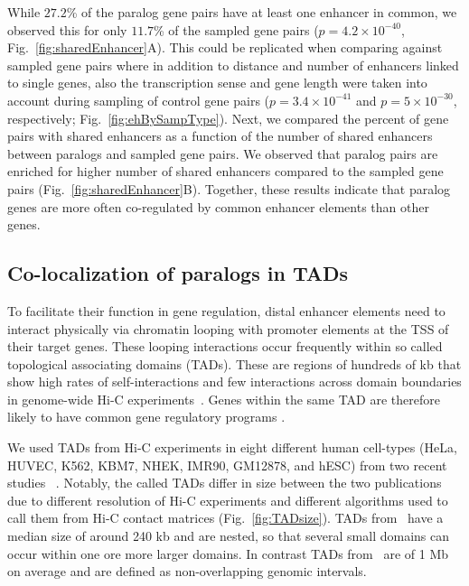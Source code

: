\documentclass[a4paper,twoside=true,openright,parskip=full,chapterprefix=true,11pt,headings=normal,bibliography=totoc,listof=totoc,titlepage=on,captions=tableabove,draft=false]{scrreprt}
\theoremstyle{definition}
\theoremstyle{definition}
\theoremstyle{definition}
\theoremstyle{remark}
\begin{document}
While \(27.2\)\% of the paralog gene pairs have at least one enhancer in
common, we observed this for only \(11.7\)\% of the sampled gene pairs
(\(p=4.2\times10^{-40}\), Fig.~\ref{fig:sharedEnhancer}A). This could be
replicated when comparing against sampled gene pairs where in addition
to distance and number of enhancers linked to single genes, also the
transcription sense and gene length were taken into account during
sampling of control gene pairs (\(p=3.4\times10^{-41}\) and
\(p=5\times10^{-30}\), respectively; Fig.~\ref{fig:ehBySampType}). Next,
we compared the percent of gene pairs with shared enhancers as a
function of the number of shared enhancers between paralogs and sampled
gene pairs. We observed that paralog pairs are enriched for higher
number of shared enhancers compared to the sampled gene pairs
(Fig.~\ref{fig:sharedEnhancer}B). Together, these results indicate that
paralog genes are more often co-regulated by common enhancer elements
than other genes.

\hypertarget{co-localization-of-paralogs-in-tads}{%
\subsection{Co-localization of paralogs in
TADs}\label{co-localization-of-paralogs-in-tads}}

To facilitate their function in gene regulation, distal enhancer
elements need to interact physically via chromatin looping with promoter
elements at the TSS of their target genes. These looping interactions
occur frequently within so called topological associating domains
(TADs). These are regions of hundreds of kb that show high rates of
self-interactions and few interactions across domain boundaries in
genome-wide Hi-C experiments~\citep{Dixon2012, Rao2014}. Genes within
the same TAD are therefore likely to have common gene regulatory
programs \citep{LeDily2014, Nora2012}.

We used TADs from Hi-C experiments in eight different human cell-types
(HeLa, HUVEC, K562, KBM7, NHEK, IMR90, GM12878, and hESC) from two
recent studies ~\citep{Dixon2012, Rao2014}. Notably, the called TADs
differ in size between the two publications due to different resolution
of Hi-C experiments and different algorithms used to call them from Hi-C
contact matrices (Fig.~\ref{fig:TADsize}). TADs from~\citep{Rao2014}
have a median size of around 240 kb and are nested, so that several
small domains can occur within one ore more larger domains. In contrast
TADs from~\citep{Dixon2012} are of 1 Mb on average and are defined as
non-overlapping genomic intervals.
\end{document}
